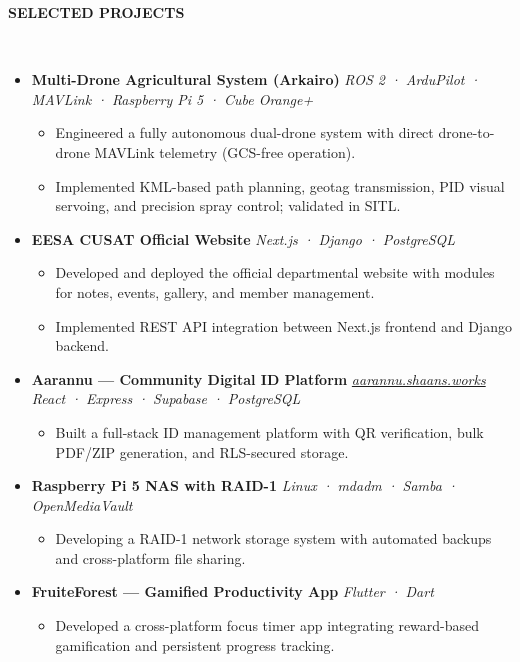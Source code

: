 \documentclass[10pt,a4paper]{article}
\newcommand{\resheading}[1]{{\small \colorbox{mygrey}{\begin{minipage}{0.99\textwidth}{\textbf{#1 \vphantom{p\^{E}}}}\end{minipage}}}}
\begin{document}
\noindent
\resheading{\textbf{SELECTED PROJECTS}}\\[-0.1cm]
\begin{itemize}[noitemsep,nolistsep]

\item \textbf{Multi-Drone Agricultural System (Arkairo)}  
\textit{ROS 2 · ArduPilot · MAVLink · Raspberry Pi 5 · Cube Orange+}  
\begin{itemize}[noitemsep]
    \item Engineered a fully autonomous dual-drone system with direct drone-to-drone MAVLink telemetry (GCS-free operation).
    \item Implemented KML-based path planning, geotag transmission, PID visual servoing, and precision spray control; validated in SITL.
\end{itemize}

\item \textbf{EESA CUSAT Official Website}  
\textit{Next.js · Django · PostgreSQL}  
\begin{itemize}[noitemsep]
    \item Developed and deployed the official departmental website with modules for notes, events, gallery, and member management.
    \item Implemented REST API integration between Next.js frontend and Django backend.
\end{itemize}

\item \textbf{Aarannu — Community Digital ID Platform} \hfill {\small \href{https://aarannu.shaans.works}{\textit{aarannu.shaans.works}}}  
\textit{React · Express · Supabase · PostgreSQL}  
\begin{itemize}[noitemsep]
    \item Built a full-stack ID management platform with QR verification, bulk PDF/ZIP generation, and RLS-secured storage.
\end{itemize}

\item \textbf{Raspberry Pi 5 NAS with RAID-1}  
\textit{Linux · mdadm · Samba · OpenMediaVault}  
\begin{itemize}[noitemsep]
    \item Developing a RAID-1 network storage system with automated backups and cross-platform file sharing.
\end{itemize}

\item \textbf{FruiteForest — Gamified Productivity App}  
\textit{Flutter · Dart}  
\begin{itemize}[noitemsep]
    \item Developed a cross-platform focus timer app integrating reward-based gamification and persistent progress tracking.
\end{itemize}

\end{itemize}
\end{document}
